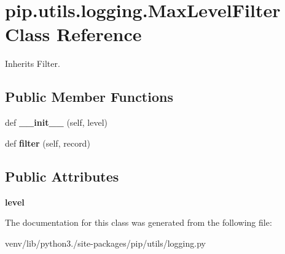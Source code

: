 \hypertarget{classpip_1_1utils_1_1logging_1_1_max_level_filter}{}\section{pip.\+utils.\+logging.\+Max\+Level\+Filter Class Reference}
\label{classpip_1_1utils_1_1logging_1_1_max_level_filter}


Inherits Filter.

\subsection*{Public Member Functions}
\begin{DoxyCompactItemize}
\item 
\mbox{\label{classpip_1_1utils_1_1logging_1_1_max_level_filter_aa00e78f0eaae077339ce80d90e224b62}} 
def {\bfseries \+\_\+\+\_\+init\+\_\+\+\_\+} (self, level)
\item 
\mbox{\label{classpip_1_1utils_1_1logging_1_1_max_level_filter_abfb5e1b9bc2a9a44f7ecc9fdfb23d72e}} 
def {\bfseries filter} (self, record)
\end{DoxyCompactItemize}
\subsection*{Public Attributes}
\begin{DoxyCompactItemize}
\item 
\mbox{\label{classpip_1_1utils_1_1logging_1_1_max_level_filter_ab8b6a5d90540a57a28c5c4bff8330a7a}} 
{\bfseries level}
\end{DoxyCompactItemize}


The documentation for this class was generated from the following file\+:\begin{DoxyCompactItemize}
\item 
venv/lib/python3./site-\/packages/pip/utils/logging.\+py\end{DoxyCompactItemize}
